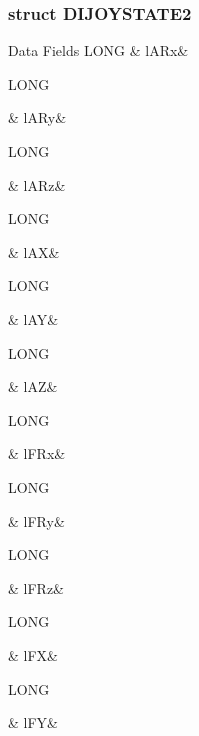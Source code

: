 \subsubsection{struct D\-I\-J\-O\-Y\-S\-T\-A\-T\-E2}
\begin{DoxyFields}{Data Fields}
\hypertarget{a00003_a0ac37e3d83b8360fdccd83cf36b317f4}{L\-O\-N\-G}\label{a00003_a0ac37e3d83b8360fdccd83cf36b317f4}
&
l\-A\-Rx&
\\
\hline

\hypertarget{a00003_a3dbf43d5bdf8902d25c0b55c08fe561b}{L\-O\-N\-G}\label{a00003_a3dbf43d5bdf8902d25c0b55c08fe561b}
&
l\-A\-Ry&
\\
\hline

\hypertarget{a00003_adc7300f31088eabfaf0e926178657736}{L\-O\-N\-G}\label{a00003_adc7300f31088eabfaf0e926178657736}
&
l\-A\-Rz&
\\
\hline

\hypertarget{a00003_aade5d3e17809f602875b927a4d38ea4d}{L\-O\-N\-G}\label{a00003_aade5d3e17809f602875b927a4d38ea4d}
&
l\-A\-X&
\\
\hline

\hypertarget{a00003_a829af37369c40dfa112567f2b9ef308c}{L\-O\-N\-G}\label{a00003_a829af37369c40dfa112567f2b9ef308c}
&
l\-A\-Y&
\\
\hline

\hypertarget{a00003_aafe199a9f9f3f021a3a2eda5d1e4c6c1}{L\-O\-N\-G}\label{a00003_aafe199a9f9f3f021a3a2eda5d1e4c6c1}
&
l\-A\-Z&
\\
\hline

\hypertarget{a00003_a31d0b5d66e1b1e0e8e99cd396e9414e4}{L\-O\-N\-G}\label{a00003_a31d0b5d66e1b1e0e8e99cd396e9414e4}
&
l\-F\-Rx&
\\
\hline

\hypertarget{a00003_ab674194faa664872a3620443b5135995}{L\-O\-N\-G}\label{a00003_ab674194faa664872a3620443b5135995}
&
l\-F\-Ry&
\\
\hline

\hypertarget{a00003_abdded1fe53ce961e721d8555e972b426}{L\-O\-N\-G}\label{a00003_abdded1fe53ce961e721d8555e972b426}
&
l\-F\-Rz&
\\
\hline

\hypertarget{a00003_aed7e0f3d42f1dfc1d69376ccdcac1b72}{L\-O\-N\-G}\label{a00003_aed7e0f3d42f1dfc1d69376ccdcac1b72}
&
l\-F\-X&
\\
\hline

\hypertarget{a00003_af60858b65f33c4f60e90753c9167a912}{L\-O\-N\-G}\label{a00003_af60858b65f33c4f60e90753c9167a912}
&
l\-F\-Y&
\\
\hline


\end{DoxyFields}
